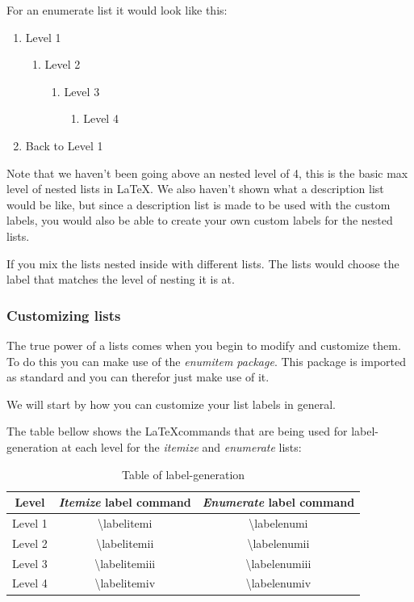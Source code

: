 \documentclass{article}
\newcommand{\jbs}[1]{\textbackslash{}#1} %
\begin{document}
For an enumerate list it would look like this:
\begin{enumerate}
    \item Level 1
    \begin{enumerate}
        \item Level 2
        \begin{enumerate}
            \item Level 3
            \begin{enumerate}
                \item Level 4
            \end{enumerate}
        \end{enumerate}
    \end{enumerate}
    \item Back to Level 1
\end{enumerate}

Note that we haven't been going above an nested level of 4, this is the basic 
max level of nested lists in \LaTeX.
We also haven't shown what a description list would be like, but since a 
description list is made to be used with the custom labels, you would also 
be able to create your own custom labels for the nested lists. 

If you mix the lists nested inside with different lists. The lists would choose
the label that matches the level of nesting it is at.


\subsubsection{Customizing lists}
The true power of a lists comes when you begin to modify and customize them.
To do this you can make use of the \textit{enumitem package}. This package is
imported as standard and you can therefor just make use of it.

We will start by how you can customize your list labels in general.

The table bellow shows the \LaTeX commands that are being used for label-generation
at each level for the \textit{itemize} and \textit{enumerate} lists:
\begin{table}[H]
    \centering
    \begin{tabular}{|c|c|c|} \hline
        \rowcolor{gray!30}
        Level & \textit{Itemize} label command & \textit{Enumerate} label command \\ \hline
        Level 1 & \jbs{labelitemi} & \jbs{labelenumi} \\ \hline
        Level 2 & \jbs{labelitemii} & \jbs{labelenumii} \\ \hline
        Level 3 & \jbs{labelitemiii} & \jbs{labelenumiii} \\ \hline
        Level 4 & \jbs{labelitemiv} & \jbs{labelenumiv} \\ \hline
    \end{tabular}
    \caption{Table of label-generation}
\end{table}
\end{document}
